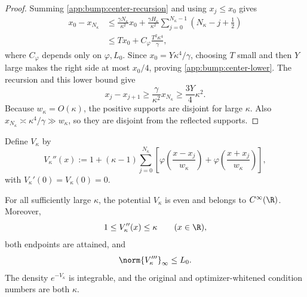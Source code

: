 \begin{proof}
Summing \eqref{app:bump:center-recursion} and using \(x_j\leq x_0\)
gives
\begin{align*}
    x_0-x_{N_\kappa}
    &\leq
    \frac{\gamma N_\kappa}{\kappa^2}x_0
    +\frac{\gamma H_\kappa}{\kappa^2}
      \sum_{j=0}^{N_\kappa-1}
      \left(N_\kappa-j+\frac12\right)\\
    &\leq
    Tx_0+C_\varphi\frac{T^2\kappa^4}{\gamma},
\end{align*}
where \(C_\varphi\) depends only on \(\varphi,L_0\).  Since
\(x_0=Y\kappa^4/\gamma\), choosing \(T\) small and then \(Y\) large
makes the right side at most \(x_0/4\), proving
\eqref{app:bump:center-lower}.  The recursion and this lower bound give
\[
    x_j-x_{j+1}
    \geq\frac{\gamma}{\kappa^2}x_{N_\kappa}
    \geq\frac{3Y}{4}\kappa^2.
\]
Because \(w_\kappa=O(\kappa)\), the positive supports are disjoint for
large \(\kappa\).  Also
\(x_{N_\kappa}\asymp\kappa^4/\gamma\gg w_\kappa\), so they are disjoint
from the reflected supports.
\end{proof}

Define \(V_\kappa\) by
\begin{equation}
\label{app:bump:potential}
    V_\kappa''(x)
    :=1+(\kappa-1)
    \sum_{j=0}^{N_\kappa}
    \left[
        \varphi\left(\frac{x-x_j}{w_\kappa}\right)
        +\varphi\left(\frac{x+x_j}{w_\kappa}\right)
    \right],
\end{equation}
with \(V_\kappa'(0)=V_\kappa(0)=0\).

\begin{lemma}
\label{app:bump:regularity}
For all sufficiently large \(\kappa\), the potential \(V_\kappa\) is
even and belongs to \(C^\infty(\R)\).  Moreover,
\begin{equation}
\label{app:bump:curvature-bounds}
    1\leq V_\kappa''(x)\leq\kappa
    \qquad(x\in\R),
\end{equation}
both endpoints are attained, and
\begin{equation}
\label{app:bump:hessian-lipschitz}
    \norm{V_\kappa'''}_\infty\leq L_0.
\end{equation}
The density \(e^{-V_\kappa}\) is integrable, and the original and
optimizer-whitened condition numbers are both \(\kappa\).
\end{lemma}

